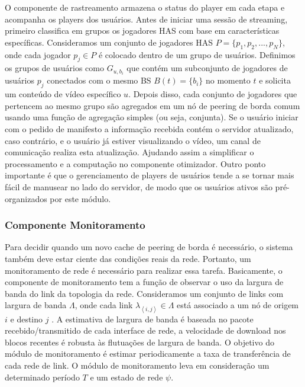 O componente de rastreamento armazena o status do player em cada etapa e acompanha os players dos usuários. Antes de iniciar uma sessão de streaming, primeiro classifica em grupos os jogadores HAS com base em características específicas. Consideramos um conjunto de jogadores HAS $P = \{p_1,p_2, ..., p_N\}$, onde cada jogador $p_j \in P$ é colocado dentro de um grupo de usuários. Definimos os grupos de usuários como $G_{u,b_{i}}$ que contém um subconjunto de jogadores de usuários $p_j$ conectados com o mesmo BS $B(t) = \{b_{i}\}$ no momento $ t$ e solicita um conteúdo de vídeo específico $u$. Depois disso, cada conjunto de jogadores que pertencem ao mesmo grupo são agregados em um nó de peering de borda comum usando uma função de agregação simples (ou seja, conjunta).
Se o usuário iniciar com o pedido de manifesto a informação recebida contém o servidor atualizado, caso contrário, e o usuário já estiver visualizando o vídeo, um canal de comunicação realiza esta atualização. Ajudando assim a simplificar o processamento e a computação no componente otimizador.
Outro ponto importante é que o gerenciamento de players de usuários tende a se tornar mais fácil de manusear no lado do servidor, de modo que os usuários ativos são pré-organizados por este módulo.


\subsubsection*{Componente Monitoramento}
Para decidir quando um novo cache de peering de borda é necessário, o sistema também deve estar ciente das condições reais da rede. Portanto, um monitoramento de rede é necessário para realizar essa tarefa.
Basicamente, o componente de monitoramento tem a função de observar o uso da largura de banda do link da topologia da rede. Consideramos um conjunto de links com largura de banda $\Lambda$, onde cada link $\lambda_{\left \langle i,j \right \rangle} \in \Lambda$ está associado a um nó de origem $i$ e destino $j$ . A estimativa de largura de banda é baseada no pacote recebido/transmitido de cada interface de rede, a velocidade de download nos blocos recentes é robusta às flutuações de largura de banda. O objetivo do módulo de monitoramento é estimar periodicamente a taxa de transferência de cada rede de link. O módulo de monitoramento leva em consideração um determinado período $T$ e um estado de rede $\psi$.


